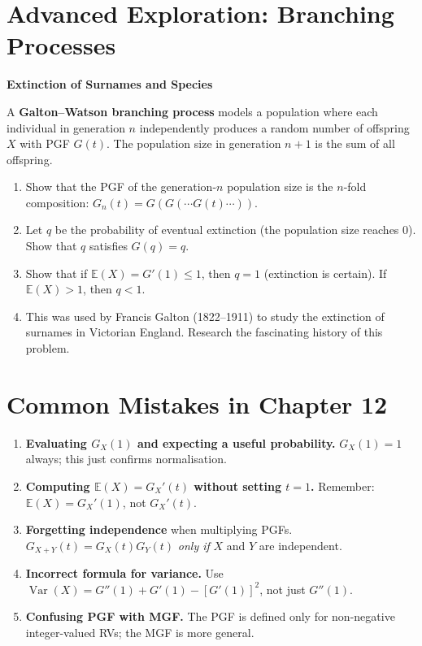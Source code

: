 \documentclass[12pt, a4paper, oneside]{book}
\theoremstyle{definition}
\theoremstyle{plain}
\theoremstyle{remark}
\newcommand{\E}{\mathbb{E}}
\newcommand{\Var}{\operatorname{Var}}
\begin{document}
\section{Advanced Exploration: Branching Processes}

\begin{exploration}
\textbf{Extinction of Surnames and Species}

A \textbf{Galton--Watson branching process} models a population where each
individual in generation $n$ independently produces a random number of
offspring $X$ with PGF $G(t)$.  The population size in generation $n+1$ is
the sum of all offspring.

\begin{enumerate}
  \item Show that the PGF of the generation-$n$ population size is the
        $n$-fold composition: $G_n(t) = G(G(\cdots G(t)\cdots))$.
  \item Let $q$ be the probability of eventual extinction (the population
        size reaches 0).  Show that $q$ satisfies $G(q)=q$.
  \item Show that if $\E(X)=G'(1)\le 1$, then $q=1$ (extinction is
        certain).  If $\E(X)>1$, then $q<1$.
  \item This was used by Francis Galton (1822--1911) to study the extinction
        of surnames in Victorian England.  Research the fascinating history
        of this problem.
\end{enumerate}
\end{exploration}

\section{Common Mistakes in Chapter 12}

\begin{warningbox}
\begin{enumerate}[label=\textbf{\arabic*.}]
  \item \textbf{Evaluating $G_X(1)$ and expecting a useful probability.}
        $G_X(1)=1$ always; this just confirms normalisation.
  \item \textbf{Computing $\E(X) = G_X'(t)$ without setting $t=1$.}
        Remember: $\E(X) = G_X'(1)$, not $G_X'(t)$.
  \item \textbf{Forgetting independence} when multiplying PGFs.
        $G_{X+Y}(t)=G_X(t)G_Y(t)$ \emph{only if} $X$ and $Y$ are independent.
  \item \textbf{Incorrect formula for variance.}  Use
        $\Var(X)=G''(1)+G'(1)-[G'(1)]^2$, not just $G''(1)$.
  \item \textbf{Confusing PGF with MGF.}  The PGF is defined only for
        non-negative integer-valued RVs; the MGF is more general.
\end{enumerate}
\end{warningbox}
\end{document}
